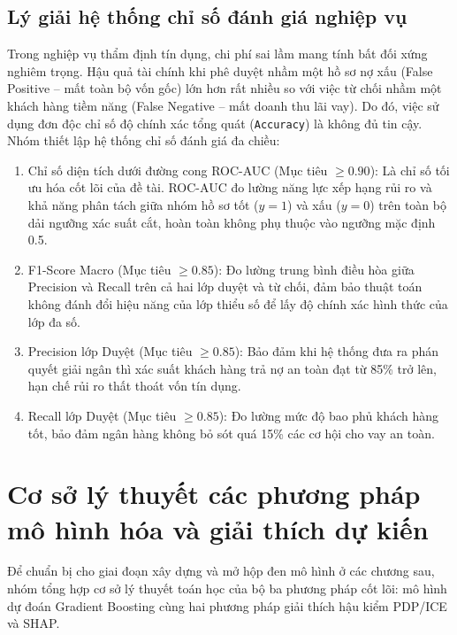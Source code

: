 \documentclass[12pt,a4paper,oneside]{report}
\begin{document}
\subsection{Lý giải hệ thống chỉ số đánh giá nghiệp vụ}
Trong nghiệp vụ thẩm định tín dụng, chi phí sai lầm mang tính bất đối xứng nghiêm trọng. Hậu quả tài chính khi phê duyệt nhầm một hồ sơ nợ xấu (False Positive -- mất toàn bộ vốn gốc) lớn hơn rất nhiều so với việc từ chối nhầm một khách hàng tiềm năng (False Negative -- mất doanh thu lãi vay). Do đó, việc sử dụng đơn độc chỉ số độ chính xác tổng quát (\texttt{Accuracy}) là không đủ tin cậy. Nhóm thiết lập hệ thống chỉ số đánh giá đa chiều:
\begin{enumerate}
    \item Chỉ số diện tích dưới đường cong ROC-AUC (Mục tiêu $\mathbf{\ge 0.90}$): Là chỉ số tối ưu hóa cốt lõi của đề tài. ROC-AUC đo lường năng lực xếp hạng rủi ro và khả năng phân tách giữa nhóm hồ sơ tốt ($y=1$) và xấu ($y=0$) trên toàn bộ dải ngưỡng xác suất cắt, hoàn toàn không phụ thuộc vào ngưỡng mặc định 0.5.
    \item F1-Score Macro (Mục tiêu $\mathbf{\ge 0.85}$): Đo lường trung bình điều hòa giữa Precision và Recall trên cả hai lớp duyệt và từ chối, đảm bảo thuật toán không đánh đổi hiệu năng của lớp thiểu số để lấy độ chính xác hình thức của lớp đa số.
    \item Precision lớp Duyệt (Mục tiêu $\mathbf{\ge 0.85}$): Bảo đảm khi hệ thống đưa ra phán quyết giải ngân thì xác suất khách hàng trả nợ an toàn đạt từ 85\% trở lên, hạn chế rủi ro thất thoát vốn tín dụng.
    \item Recall lớp Duyệt (Mục tiêu $\mathbf{\ge 0.85}$): Đo lường mức độ bao phủ khách hàng tốt, bảo đảm ngân hàng không bỏ sót quá 15\% các cơ hội cho vay an toàn.
\end{enumerate}

\section{Cơ sở lý thuyết các phương pháp mô hình hóa và giải thích dự kiến}

Để chuẩn bị cho giai đoạn xây dựng và mở hộp đen mô hình ở các chương sau, nhóm tổng hợp cơ sở lý thuyết toán học của bộ ba phương pháp cốt lõi: mô hình dự đoán Gradient Boosting cùng hai phương pháp giải thích hậu kiểm PDP/ICE và SHAP.
\end{document}
